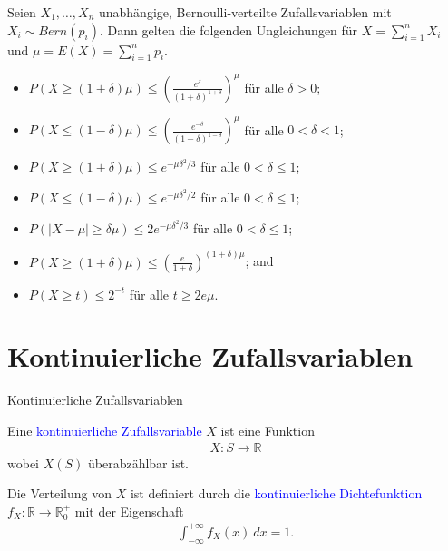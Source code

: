 \documentclass{beamer}
\def\spadding{\vspace{0.25cm}}
\def\b{\textcolor{blue}}
\begin{document}
\begin{frame}
    \begin{definition}[Chernoff]
        Seien $X_1, \dots, X_n$ unabhängige, Bernoulli-verteilte Zufallsvariablen mit $X_i \sim Bern(p_i)$. Dann gelten die folgenden Ungleichungen für $X = \sum_{i=1}^n X_i$ und $\mu = E(X) = \sum_{i=1}^n p_i$.\pause
        \begin{itemize}
            \item $P(X \geq (1 + \delta) \mu) \leq \left(\frac{e^{\delta}}{(1 + \delta)^{1 + \delta}}\right)^{\mu}$ für alle $\delta > 0$;
            \item $P(X \leq (1 - \delta) \mu) \leq \left(\frac{e^{- \delta}}{(1 - \delta)^{1 - \delta}}\right)^{\mu}$ für alle $0 < \delta < 1$\pause;
            \item $P(X \geq (1 + \delta) \mu) \leq e^{- \mu \delta^2 / 3}$ für alle $0 < \delta \leq 1$;
            \item $P(X \leq (1 - \delta) \mu) \leq e^{- \mu \delta^2 / 2}$ für alle $0 < \delta \leq 1$;
            \item $P(|X - \mu| \geq \delta \mu) \leq 2 e^{- \mu \delta^2 / 3}$ für alle $0 < \delta \leq 1$;
            \item $P(X \geq (1 + \delta) \mu) \leq \left(\frac{e}{1 + \delta}\right)^{(1 + \delta) \mu}$; and
            \item $P(X \geq t) \leq 2^{-t}$ für alle $t \geq 2 e \mu$.
        \end{itemize}
    \end{definition}
\end{frame}

\section{Kontinuierliche Zufallsvariablen}
\begin{frame}{Kontinuierliche Zufallsvariablen}
    \begin{definition}
        Eine \b{kontinuierliche Zufallsvariable} $X$ ist eine Funktion
        \begin{align*}
            X: S \to \mathbb{R}
        \end{align*}
        wobei $X(S)$ überabzählbar ist.\pause\par\spadding
        Die Verteilung von $X$ ist definiert durch die \b{kontinuierliche Dichtefunktion} $f_X: \mathbb{R} \to \mathbb{R}_0^+$ mit der Eigenschaft
        \begin{align*}
            \int_{- \infty}^{+ \infty} f_X(x)\ dx = 1.
        \end{align*}
    \end{definition}
\end{frame}
\end{document}

